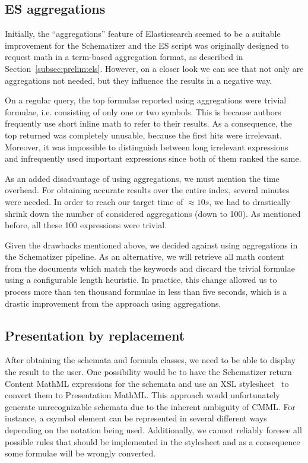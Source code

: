 \documentclass[a4paper,oneside]{article}
\def\cmml{\textsf{Content MathML}\xspace}
\def\pmml{\textsf{Presentation MathML}\xspace}
\begin{document}
\subsection{ES aggregations}\label{subsec:esagg}
Initially, the ``aggregations'' feature of Elasticsearch seemed to be a
suitable improvement for the Schematizer and the ES script was originally
designed to request math in a term-based aggregation format, as described in
Section~\ref{subsec:prelim:els}. However, on a closer look we can see that not
only are aggregations not needed, but they influence the results in a negative
way.

On a regular query, the top formulae reported using aggregations were trivial
formulae, i.e. consisting of only one or two symbols. This is because authors
frequently use short inline math to refer to their results. As a consequence,
the top returned was completely unusable, because the first hits were
irrelevant. Moreover, it was impossible to distinguish between long irrelevant
expressions and infrequently used important expressions since both of them
ranked the same.

As an added disadvantage of using aggregations, we must mention the time
overhead. For obtaining accurate results over the entire index, several
minutes were needed. In order to reach our target time of $\approx 10s$, we had to
drastically shrink down the number of considered aggregations (down to 100).
As mentioned before, all these 100 expressions were trivial.

Given the drawbacks mentioned above, we decided against using aggregations in
the Schematizer pipeline. As an alternative, we will retrieve all math content
from the documents which match the keywords and discard the trivial formulae
using a configurable length heuristic. In practice, this change allowed us to
process more than ten thousand formulae in less than five seconds, which is a
drastic improvement from the approach using aggregations.

\subsection{Presentation by replacement}\label{subsec:make_sch_recog}
After obtaining the schemata and formula classes, we need to be able to display
the result to the user. One possibility would be to have the Schematizer return
\cmml expressions for the schemata and use an XSL
stylesheet~\cite{carlisle:online} to convert them to \pmml. This approach
would unfortunately generate unrecognizable schemata due to the inherent
ambiguity of CMML. For instance, a \textsf{csymbol} element can be
represented in several different ways depending on the notation being used.
Additionally, we cannot reliably foresee all possible rules that should be
implemented in the stylesheet and as a consequence some formulae will be
wrongly converted.
\end{document}
